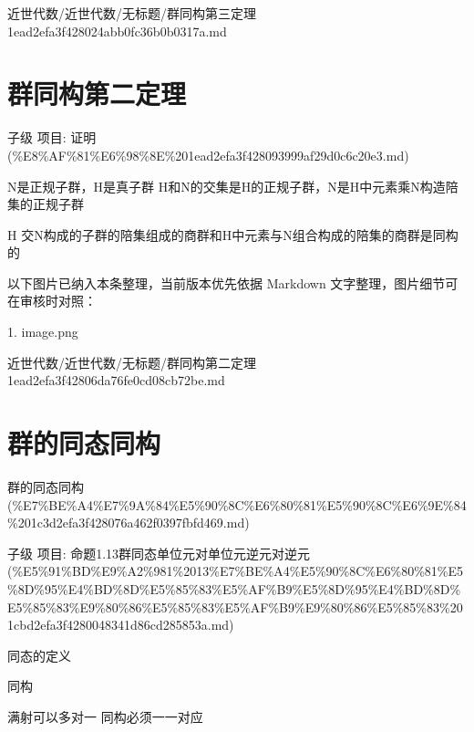 \begin{note}[来源路径]

近世代数/近世代数/无标题/群同构第三定理 1ead2efa3f428024abb0fc36b0b0317a.md

\end{note}

\section*{群同构第二定理}

\begin{theorem}[群同构第二定理]

子级 项目: 证明 (\%E8\%AF\%81\%E6\%98\%8E\%201ead2efa3f428093999af29d0c6c20e3.md)

N是正规子群，H是真子群 H和N的交集是H的正规子群，N是H中元素乘N构造陪集的正规子群

H 交N构成的子群的陪集组成的商群和H中元素与N组合构成的陪集的商群是同构的

\end{theorem}

\begin{note}[关联图片]
以下图片已纳入本条整理，当前版本优先依据 Markdown 文字整理，图片细节可在审核时对照：

1. image.png\\

\end{note}

\begin{note}[来源路径]

近世代数/近世代数/无标题/群同构第二定理 1ead2efa3f42806da76fe0cd08cb72be.md

\end{note}

\section*{群的同态同构}

\begin{note}[来源上级主题]

群的同态同构 (\%E7\%BE\%A4\%E7\%9A\%84\%E5\%90\%8C\%E6\%80\%81\%E5\%90\%8C\%E6\%9E\%84\%201c3d2efa3f428076a462f0397fbfd469.md)

\end{note}

\begin{note}[群的同态同构]

子级 项目: 命题1.13群同态单位元对单位元逆元对逆元 (\%E5\%91\%BD\%E9\%A2\%981\%2013\%E7\%BE\%A4\%E5\%90\%8C\%E6\%80\%81\%E5\%8D\%95\%E4\%BD\%8D\%E5\%85\%83\%E5\%AF\%B9\%E5\%8D\%95\%E4\%BD\%8D\%E5\%85\%83\%E9\%80\%86\%E5\%85\%83\%E5\%AF\%B9\%E9\%80\%86\%E5\%85\%83\%201cbd2efa3f4280048341d86cd285853a.md)

同态的定义

同构

满射可以多对一 同构必须一一对应

\end{note}

